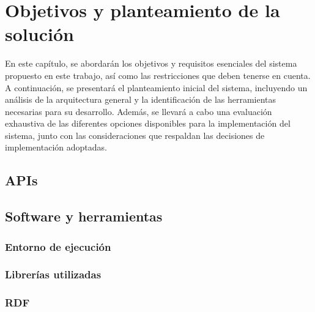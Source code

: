 \chapter{Objetivos y planteamiento de la solución}
\label{cap:Objetivos y planteamiento de la solución}
En este capítulo, se abordarán los objetivos y requisitos esenciales del sistema propuesto en este trabajo, así como las restricciones que deben tenerse en cuenta. A continuación, se presentará el planteamiento inicial del sistema, incluyendo un análisis de la arquitectura general y la identificación de las herramientas necesarias para su desarrollo. Además, se llevará a cabo una evaluación exhaustiva de las diferentes opciones disponibles para la implementación del sistema, junto con las consideraciones que respaldan las decisiones de implementación adoptadas.

\section{APIs}








\section{Software y herramientas}



\subsection{Entorno de ejecución}
\subsection{Librerías utilizadas}

\subsection{RDF}

